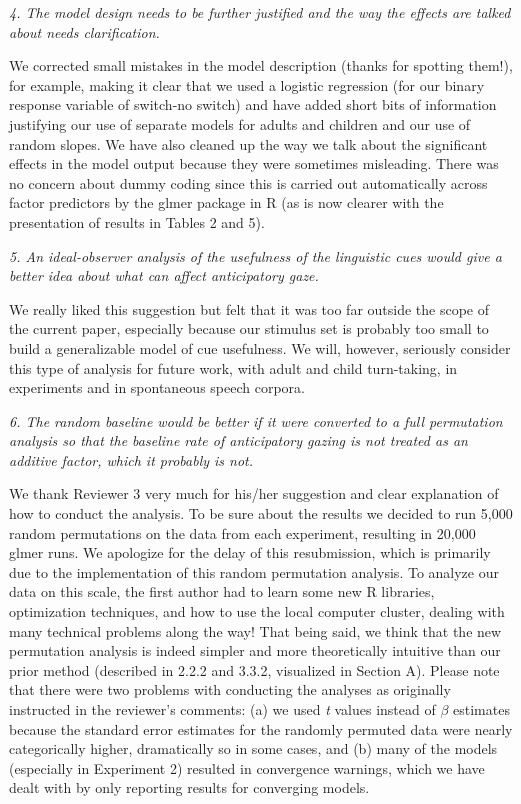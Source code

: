 \documentclass[11pt,a4paper]{letter} %
\begin{document}
\begin{letter}{}
\smallskip

\noindent \textit{4. The model design needs to be further justified and the way the effects are talked about needs clarification.}

\noindent We corrected small mistakes in the model description (thanks for spotting them!), for example, making it clear that we used a logistic regression (for our binary response variable of switch-no switch) and have added short bits of information justifying our use of separate models for adults and children and our use of random slopes. We have also cleaned up the way we talk about the significant effects in the model output because they were sometimes misleading. There was no concern about dummy coding since this is carried out automatically across factor predictors by the glmer package in R (as is now clearer with the presentation of results in Tables 2 and 5).

\smallskip

\noindent \textit{5. An ideal-observer analysis of the usefulness of the linguistic cues would give a better idea about what can affect anticipatory gaze.}

\noindent We really liked this suggestion but felt that it was too far outside the scope of the current paper, especially because our stimulus set is probably too small to build a generalizable model of cue usefulness. We will, however, seriously consider this type of analysis for future work, with adult and child turn-taking, in experiments and in spontaneous speech corpora. 

\smallskip

\noindent \textit{6. The random baseline would be better if it were converted to a full permutation analysis so that the baseline rate of anticipatory gazing is not treated as an additive factor, which it probably is not.}

\noindent We thank Reviewer 3 very much for his/her suggestion and clear explanation of how to conduct the analysis. To be sure about the results we decided to run 5,000 random permutations on the data from each experiment, resulting in 20,000 glmer runs. We apologize for the delay of this resubmission, which is primarily due to the implementation of this random permutation analysis. To analyze our data on this scale, the first author had to learn some new R libraries, optimization techniques, and how to use the local computer cluster, dealing with many technical problems along the way! That being said, we think that the new permutation analysis is indeed simpler and more theoretically intuitive than our prior method (described in 2.2.2 and 3.3.2, visualized in Section A). Please note that there were two problems with conducting the analyses as originally instructed in the reviewer's comments: (a) we used \textit{t} values instead of \textit{$\beta$} estimates because the standard error estimates for the randomly permuted data were nearly categorically higher, dramatically so in some cases, and (b) many of the models (especially in Experiment 2) resulted in convergence warnings, which we have dealt with by only reporting results for converging models.


\end{letter}
\end{document}
